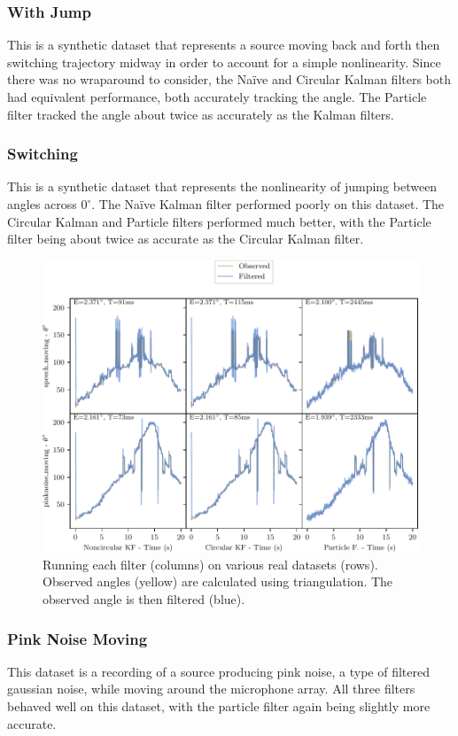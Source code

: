 \documentclass[11pt]{amsart}
\begin{document}
\subsubsection{With Jump}
This is a synthetic dataset that represents a source moving back and forth then switching trajectory midway in order to account for a simple nonlinearity. Since there was no wraparound to consider, the Naïve and Circular Kalman filters both had equivalent performance, both accurately tracking the angle. The Particle filter tracked the angle about twice as accurately as the Kalman filters.
\subsubsection{Switching}
This is a synthetic dataset that represents the nonlinearity of jumping between angles across $0^{\circ}$. The Naïve Kalman filter performed poorly on this dataset. The Circular Kalman and Particle filters performed much better, with the Particle filter being about twice as accurate as the Circular Kalman filter.
\begin{figure}[htp]
    \centering
    \includegraphics[width=.75\textwidth]{actual_paper_graphs/all_real.pdf}\hfill
    \caption{Running each filter (columns) on various real datasets (rows). Observed angles (yellow) are calculated using triangulation. The observed angle is then filtered (blue).}
    \label{fig:all_real}
\end{figure}
\subsubsection{Pink Noise Moving}
This dataset is a recording of a source producing pink noise, a type of filtered gaussian noise, while moving around the microphone array. All three filters behaved well on this dataset, with the particle filter again being slightly more accurate. 
\end{document}
